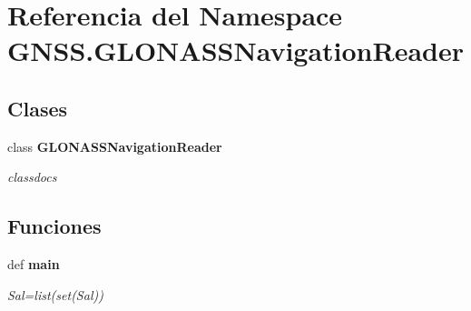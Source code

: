 \section{Referencia del Namespace G\-N\-S\-S.\-G\-L\-O\-N\-A\-S\-S\-Navigation\-Reader}
\label{namespaceGNSS_1_1GLONASSNavigationReader}
\subsection*{Clases}
\begin{DoxyCompactItemize}
\item 
class {\bf G\-L\-O\-N\-A\-S\-S\-Navigation\-Reader}
\begin{DoxyCompactList}\small\item\em classdocs \end{DoxyCompactList}\end{DoxyCompactItemize}
\subsection*{Funciones}
\begin{DoxyCompactItemize}
\item 
def {\bf main}
\begin{DoxyCompactList}\small\item\em Sal=list(set(\-Sal)) \end{DoxyCompactList}\end{DoxyCompactItemize}
